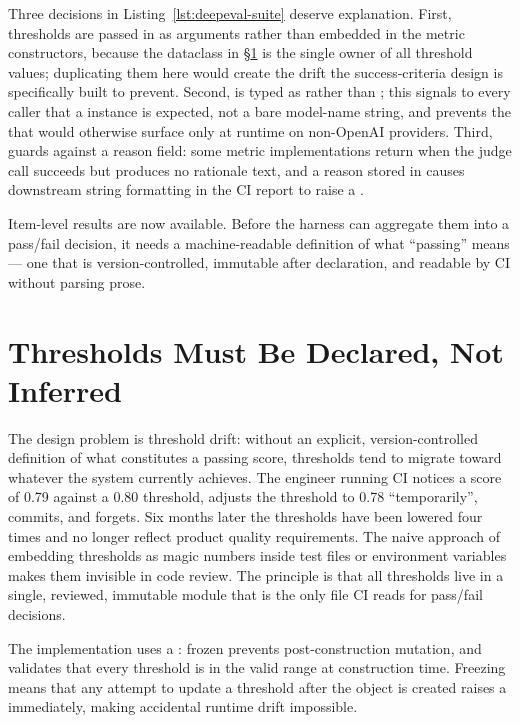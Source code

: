 Three decisions in Listing~\ref{lst:deepeval-suite} deserve explanation.
First, thresholds are passed in as arguments rather than embedded in the
metric constructors, because the  dataclass in
\S\ref{sec:success-criteria} is the single owner of all threshold values;
duplicating them here would create the drift the success-criteria design is
specifically built to prevent.  Second,  is typed as
 rather than ; this signals to every caller that a
 instance is expected, not a bare model-name string,
and prevents the  that would otherwise surface only at
runtime on non-OpenAI providers.  Third,  guards
against a  reason field: some metric implementations return
 when the judge call succeeds but produces no rationale text,
and a  reason stored in  causes downstream
string formatting in the CI report to raise a .

Item-level results are now available.  Before the harness can aggregate
them into a pass/fail decision, it needs a machine-readable definition of
what ``passing'' means --- one that is version-controlled, immutable after
declaration, and readable by CI without parsing prose.

\section{Thresholds Must Be Declared, Not Inferred}
\label{sec:success-criteria}

The design problem is threshold drift: without an explicit, version-controlled
definition of what constitutes a passing score, thresholds tend to migrate
toward whatever the system currently achieves.  The engineer running CI
notices a score of 0.79 against a 0.80 threshold, adjusts the threshold to
0.78 ``temporarily'', commits, and forgets.  Six months later the thresholds
have been lowered four times and no longer reflect product quality
requirements.  The naive approach of embedding thresholds as magic numbers
inside test files or environment variables makes them invisible in code
review.  The principle is that all thresholds live in a single, reviewed,
immutable module that is the only file CI reads for pass/fail decisions.

The implementation uses a : frozen prevents
post-construction mutation, and  validates that every
threshold is in the valid range at construction time.  Freezing means that
any attempt to update a threshold after the object is created raises a
 immediately, making accidental runtime drift
impossible.

